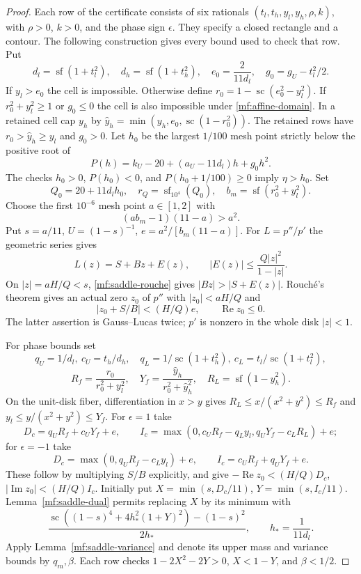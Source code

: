 \documentclass[11pt,reqno]{amsart}
\numberwithin{equation}{section}
\theoremstyle{definition}
\theoremstyle{remark}
\renewcommand{\Re}{\operatorname{Re}}
\renewcommand{\Im}{\operatorname{Im}}
\begin{document}
\begin{proof}
Each row of the certificate consists of six rationals
$(t_l,t_h,y_l,y_h,\rho,k)$, with $\rho>0$, $k>0$, and the
phase sign $\epsilon$.
They specify a closed rectangle and a contour. The following
construction gives every bound used to check that row.
Put
\[
 d_l=\operatorname{sf}(1+t_l^2),\quad
 d_h=\operatorname{sf}(1+t_h^2),\quad
 e_0=\frac2{11d_l},\quad
 g_0=g_U-t_l^2/2.
\]
If $y_l>e_0$ the cell is impossible. Otherwise define
$r_0=1-\operatorname{sc}(e_0^2-y_l^2)$.
If $r_0^2+y_l^2\ge1$ or $g_0\le0$ the cell is also impossible
under \eqref{mf:affine-domain}. In a retained cell
cap $y_h$ by
$\widehat y_h=\min(y_h,e_0,\operatorname{sc}(1-r_0^2))$.
The retained rows have $r_0>\widehat y_h\ge y_l$ and $g_0>0$.
Let $h_0$ be the largest $1/100$ mesh point strictly below the
positive root of
\[
 P(h)=k_U-20+(a_U-11d_l)h+g_0h^2.
\]
The checks $h_0>0$, $P(h_0)<0$, and $P(h_0+1/100)\ge0$
imply $\eta>h_0$. Set
\[
 Q_0=20+11d_lh_0,\quad r_Q=\operatorname{sf}_{10^4}(Q_0),\quad
 b_m=\operatorname{sf}(r_0^2+y_l^2).
\]
Choose the first $10^{-6}$ mesh point $a\in[1,2]$ with
\begin{equation}\label{mf:saddle-rouche}
 (ab_m-1)(11-a)>a^2.
\end{equation}
Put $s=a/11$, $U=(1-s)^{-1}$, $e=a^2/[b_m(11-a)]$.
For $L=p''/p'$ the geometric series gives
\[
 L(z)=S+Bz+E(z),\qquad |E(z)|\le\frac{Q|z|^2}{1-|z|}.
\]
On $|z|=aH/Q<s$, \eqref{mf:saddle-rouche} gives
$|Bz|>|S+E(z)|$. Rouch\'e's theorem gives an actual zero $z_0$
of $p''$ with $|z_0|<aH/Q$ and
\[
 |z_0+S/B|<(H/Q)e,\qquad \Re z_0\le0.
\]
The latter assertion is Gauss--Lucas twice; $p'$ is nonzero
in the whole disk $|z|<1$.

For phase bounds set
\[
 q_U=1/d_l,\ c_U=t_h/d_h,\quad
 q_L=1/\operatorname{sc}(1+t_h^2),\
 c_L=t_l/\operatorname{sc}(1+t_l^2),
\]
\[
 R_f=\frac{r_0}{r_0^2+y_l^2},\quad
 Y_f=\frac{\widehat y_h}{r_0^2+\widehat y_h^2},\quad
 R_L=\operatorname{sf}(1-\widehat y_h^2).
\]
On the unit-disk fiber, differentiation in $x>y$ gives
$R_L\le x/(x^2+y^2)\le R_f$ and
$y_l\le y/(x^2+y^2)\le Y_f$. For $\epsilon=1$ take
\[
 D_c=q_UR_f+c_UY_f+e,\qquad
 I_c=\max(0,c_UR_f-q_Ly_l,q_UY_f-c_LR_L)+e;
\]
for $\epsilon=-1$ take
\[
 D_c=\max(0,q_UR_f-c_Ly_l)+e,\qquad
 I_c=c_UR_f+q_UY_f+e.
\]
These follow by multiplying $S/B$ explicitly, and give
$-\Re z_0<(H/Q)D_c$, $|\Im z_0|<(H/Q)I_c$.
Initially put $X=\min(s,D_c/11)$, $Y=\min(s,I_c/11)$.
Lemma~\ref{mf:saddle-dual} permits replacing $X$ by its minimum
with
\[
 \frac{\operatorname{sc}((1-s)^4+4h_*^2(1+Y)^2)-(1-s)^2}
      {2h_*},\qquad h_*=\frac1{11d_l}.
\]
Apply Lemma~\ref{mf:saddle-variance} and denote its upper
mass and variance bounds by $q_m,\beta$. Each row checks
$1-2X^2-2Y>0$, $X<1-Y$, and $\beta<1/2$.


\end{proof}
\end{document}
